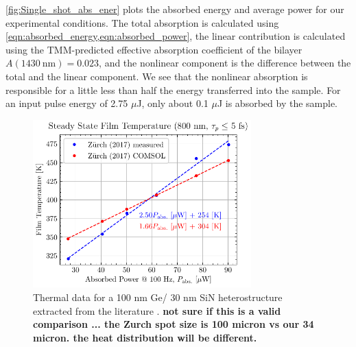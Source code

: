 \cref{fig:Single_shot_abs_ener} plots the absorbed energy and average power for our experimental conditions. The total absorption is calculated using \cref{eqn:absorbed_energy,eqn:absorbed_power}, the linear contribution is calculated using the TMM-predicted effective absorption coefficient of the bilayer $A (1430 \ \textrm{nm}) = 0.023$, and the nonlinear component is the difference between the total and the linear component. We see that the nonlinear absorption is responsible for a little less than half the energy transferred into the sample. For an input pulse energy of 2.75 $\mu$J, only about 0.1 $\mu$J is absorbed by the sample.

\begin{figure}
	\centering
	\includegraphics[width=0.75\textwidth]{figures/chap4/COMSOL_temp_power.pdf}
	\caption{Thermal data for a 100 nm Ge/ 30 nm SiN heterostructure extracted from the literature \cite{zurchDirectSimultaneousObservation2017}. \textbf{not sure if this is a valid comparison ... the Zurch spot size is 100 micron vs our 34 micron. the heat distribution will be different.}}
	\label{fig:COMSOL_temp_power}
\end{figure}

